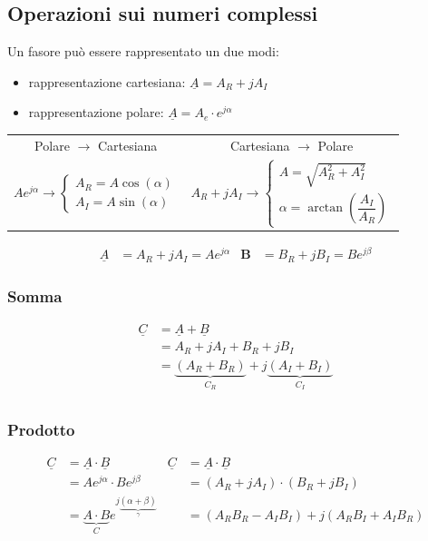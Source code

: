 \documentclass{article}
\begin{document}
\subsection{Operazioni sui numeri complessi}
Un fasore può essere rappresentato un due modi:
\begin{itemize}
    \item rappresentazione cartesiana: $\underline{A} = A_R + j A_I$
    \item rappresentazione polare: $\underline{A} = A_e \cdot e^{j \alpha}$
\end{itemize}
\begin{center}
   \begin{tabular}{c|c}
    Polare $\rightarrow$ Cartesiana & Cartesiana $\rightarrow$ Polare\\
    $ Ae^{j \alpha} \longrightarrow 
    \begin{cases}
        A_R = A \cos(\alpha)\\
        A_I = A \sin(\alpha)
    \end{cases} $
    &
    $A_R+jA_I \longrightarrow 
    \begin{cases}
        A = \sqrt{A_R^2+A_I^2}\\
        \alpha = \arctan \left(\dfrac{A_I}{A_R}\right)
    \end{cases}$
    \end{tabular} 
\end{center}
\begin{align*}
    \underline{A} &= A_R+j A_I = Ae^{j \alpha} & \textbf{B} &= B_R + j B_I = Be^{j\beta}
\end{align*}

\subsubsection*{Somma}
\begin{align*}
    \underline{C} &= \underline{A} + \underline{B}\\
    &=A_R+jA_I + B_R + jB_I \\
    &= \underbrace{(A_R+B_R)}_{C_R} + j\underbrace{(A_I+B_I)}_{C_I}\\
\end{align*}

\subsubsection*{Prodotto}
\begin{align*}
    \underline{C} &= \underline{A} \cdot \underline{B} & 
    \underline{C} &= \underline{A} \cdot \underline{B}
    \\
    &=A e^{j\alpha}\cdot Be^{j\beta} &
    &=(A_R+jA_I) \cdot (B_R+jB_I)
    \\
    &=\underbrace{A \cdot B}_{C} e^{j\underbrace{(\alpha + \beta)}_{\gamma}} &
    &=(A_RB_R-A_IB_I) + j(A_RB_I+A_IB_R)
\end{align*}
\end{document}
